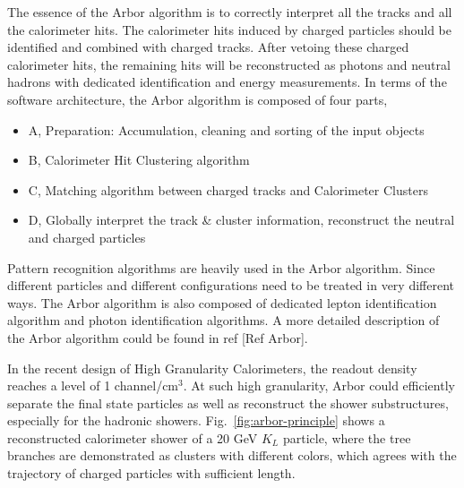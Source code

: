 The essence of the Arbor algorithm is to correctly interpret all the tracks and all the calorimeter hits.
The calorimeter hits induced by charged particles should be identified and combined with charged tracks.
After vetoing these charged calorimeter hits,
the remaining hits will be reconstructed as photons and neutral hadrons with dedicated identification and energy measurements.
In terms of the software architecture, the Arbor algorithm is composed of four parts,

\begin{itemize}
\item[]A, Preparation: Accumulation, cleaning and sorting of the input objects
\item[]B, Calorimeter Hit Clustering algorithm 
\item[]C, Matching algorithm between charged tracks and Calorimeter Clusters
\item[]D, Globally interpret the track \& cluster information, reconstruct the neutral and charged particles
\end{itemize}
 
Pattern recognition algorithms are heavily used in the Arbor algorithm.
Since different particles and different configurations need to be treated in very different ways.
The Arbor algorithm is also composed of dedicated lepton identification algorithm and photon identification algorithms.
A more detailed description of the Arbor algorithm could be found in ref [Ref Arbor].

In the recent design of High Granularity Calorimeters, the readout density reaches a level of 1 channel/cm$^3$.
At such high granularity, Arbor could efficiently separate the final state particles as well as reconstruct the shower substructures,
especially for the hadronic showers.
Fig.~\ref{fig:arbor-principle} shows a reconstructed calorimeter shower of a 20 GeV $K_L$ particle,
where the tree branches are demonstrated as clusters with different colors,
which agrees with the trajectory of charged particles with sufficient length. 

